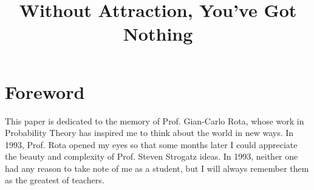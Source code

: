 \documentclass{article}
\begin{document}
\title{Without Attraction, You've Got Nothing}

\author{}
\date{}
\maketitle

\section*{Foreword}
This paper is dedicated to the memory of Prof. Gian-Carlo Rota, whose work in Probability Theory has inspired me to think about the world in new ways. In 1993, Prof. Rota opened my eyes so that some months later I could appreciate the beauty and complexity of Prof. Steven Strogatz ideas. In 1993, neither one had any reason to take note of me as a student, but I will always remember them as the greatest of teachers.
\end{document}
